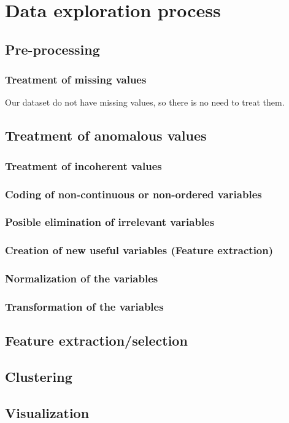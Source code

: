 \section{Data exploration process}

\subsection{Pre-processing}
\subsubsection{Treatment of missing values}
Our dataset do not have missing values, so there is no need to treat them.
\subsection{Treatment of anomalous values}
\subsubsection{Treatment of incoherent values}
\subsubsection{Coding of non-continuous or non-ordered variables}
\subsubsection{Posible elimination of irrelevant variables}
\subsubsection{Creation of new useful variables (Feature extraction)}
\subsubsection{Normalization of the variables}
\subsubsection{Transformation of the variables}


\subsection{Feature extraction/selection}
\subsection{Clustering}
\subsection{Visualization}
